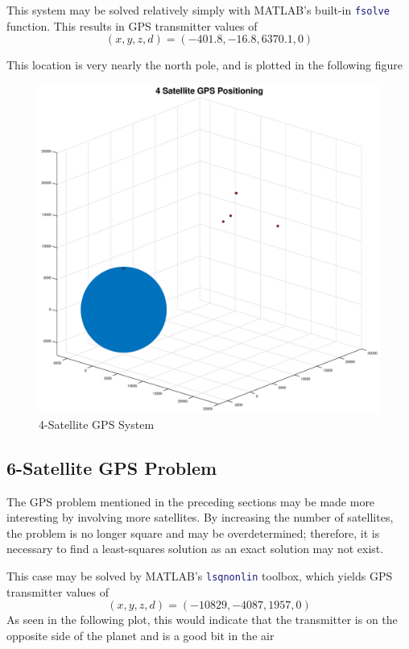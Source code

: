 \documentclass[10pt,a4paper]{article}
\begin{document}
This system may be solved relatively simply with MATLAB's built-in \lstinline[language=Matlab]|fsolve| function. This results in GPS transmitter values of 
$$
(x,y,z,d) = (-401.8, -16.8, 6370.1, 0)
$$

This location is very nearly the north pole, and is plotted in the following figure

\begin{figure}[H]
\includegraphics[width=\linewidth]{Figures/4satgps.eps}
\caption{4-Satellite GPS System}
\label{fig: 4satgps}
\end{figure}

\subsection*{6-Satellite GPS Problem}

The GPS problem mentioned in the preceding sections may be made more interesting by involving more satellites. By increasing the number of satellites, the problem is no longer square and may be overdetermined; therefore, it is necessary to find a least-squares solution as an exact solution may not exist.

This case may be solved by MATLAB's \lstinline[language=Matlab]|lsqnonlin| toolbox, which yields GPS transmitter values of
$$
(x, y, z, d) = (-10829, -4087, 1957, 0)
$$
As seen in the following plot, this would indicate that the transmitter is on the opposite side of the planet and is a good bit in the air
\end{document}
